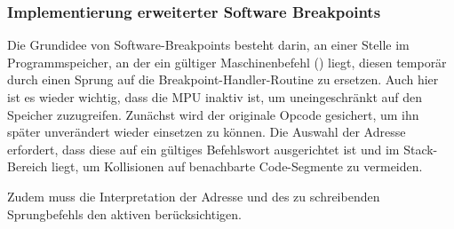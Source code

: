 
\subsubsection{Implementierung erweiterter Software Breakpoints}
\label{sec:ImplementierungSoftwareBreakpoints}

Die Grundidee von Software-Breakpoints besteht darin, an einer Stelle im Programmspeicher, an der ein g\"ultiger Maschinenbefehl () liegt, diesen tempor\"ar durch einen Sprung auf die Breakpoint-Handler-Routine zu ersetzen. Auch hier ist es wieder wichtig, dass die MPU inaktiv ist, um uneingeschr\"ankt auf den Speicher zuzugreifen. Zun\"achst wird der originale Opcode gesichert, um ihn sp\"ater unver\"andert wieder einsetzen zu k\"onnen. Die Auswahl der Adresse erfordert, dass diese auf ein g\"ultiges Befehlswort ausgerichtet ist und im Stack-Bereich liegt, um Kollisionen auf benachbarte Code-Segmente zu vermeiden. 

\newpage
Zudem muss die Interpretation der Adresse und des zu schreibenden Sprungbefehls den aktiven  ber\"ucksichtigen.

